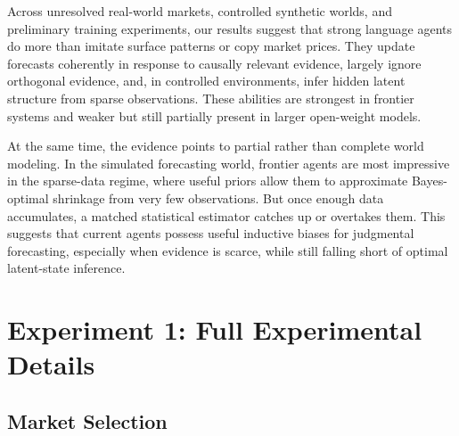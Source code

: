 \documentclass{article} %
\begin{document}
Across unresolved real-world markets, controlled synthetic worlds, and preliminary training experiments, our results suggest that strong language agents do more than imitate surface patterns or copy market prices. They update forecasts coherently in response to causally relevant evidence, largely ignore orthogonal evidence, and, in controlled environments, infer hidden latent structure from sparse observations. These abilities are strongest in frontier systems and weaker but still partially present in larger open-weight models.

At the same time, the evidence points to partial rather than complete world modeling. In the simulated forecasting world, frontier agents are most impressive in the sparse-data regime, where useful priors allow them to approximate Bayes-optimal shrinkage from very few observations. But once enough data accumulates, a matched statistical estimator catches up or overtakes them. This suggests that current agents possess useful inductive biases for judgmental forecasting, especially when evidence is scarce, while still falling short of optimal latent-state inference.






\section{Experiment 1: Full Experimental Details}
\label{app:exp1}

\subsection{Market Selection}
\label{app:market-selection}
\end{document}
